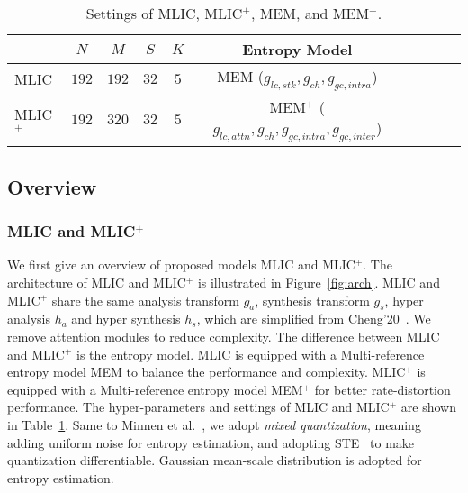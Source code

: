 \documentclass[sigconf]{acmart}
\begin{document}
\begin{table}
  \footnotesize
  \centering
  \begin{tabular}{lccccccccc}
    \toprule
                & $N$    & $M$    & $S$     & $K$    & Entropy Model       \\ \midrule
      MLIC     & $192$  & $192$  &$32$  & $5$   &   MEM ($g_{lc,stk}, g_{ch}, g_{gc,intra}$)     \\\midrule
      MLIC$^+$ & $192$  & $320$  &$32$  & $5$   &   MEM$^+$ ($g_{lc,attn}, g_{ch}, g_{gc,intra}, g_{gc,inter}$)     \\\midrule
  \end{tabular}
  \caption{Settings of MLIC, MLIC$^+$, MEM, and MEM$^+$.}
  \label{tab:settings}
\end{table}
\subsection{Overview}
\subsubsection{MLIC and MLIC$^+$}
We first give an overview of proposed models MLIC and MLIC$^+$.
The architecture of MLIC and MLIC$^+$ is illustrated in Figure~\ref{fig:arch}.
MLIC and MLIC$^+$ share the same analysis transform $g_a$, synthesis transform $g_s$,
hyper analysis $h_a$ and hyper synthesis $h_s$, which are simplified from
Cheng'20~\cite{DBLP:conf/cvpr/ChengSTK20}.
We remove attention modules to reduce complexity.
The difference between MLIC and MLIC$^+$ is the entropy model.
MLIC is equipped with a Multi-reference entropy model MEM to balance the performance and complexity.
MLIC$^+$ is equipped with a Multi-reference entropy model MEM$^+$
for better rate-distortion performance.
The hyper-parameters and settings of MLIC and MLIC$^+$ are shown in Table~\ref{tab:settings}.
Same to Minnen et al.~\cite{DBLP:conf/icip/MinnenS20},
we adopt \textit{mixed quantization}, meaning adding uniform noise for entropy estimation,
and adopting STE~\cite{DBLP:conf/iclr/TheisSCH17} to make quantization differentiable.
Gaussian mean-scale distribution is adopted for entropy estimation.
\end{document}
